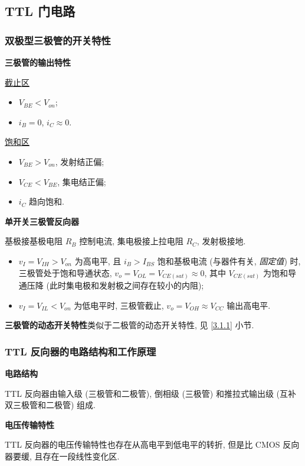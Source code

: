 \subsection{TTL 门电路}
\subsubsection{双极型三极管的开关特性}
\textbf{三极管的输出特性}

\underline{截止区}
\begin{itemize}
    \item $V_{BE}<V_{on}$;
    \item $i_B=0$, $i_C\approx 0$.
\end{itemize}

\underline{饱和区}
\begin{itemize}
    \item $V_{BE}>V_{on}$, 发射结正偏;
    \item $V_{CE}<V_{BE}$, 集电结正偏;
    \item $i_C$ 趋向饱和.
\end{itemize}

\textbf{单开关三极管反向器}

基极接基极电阻 $R_B$ 控制电流, 集电极接上拉电阻 $R_C$, 发射极接地.

\begin{itemize}
    \item $v_I=V_{IH}>V_{on}$ 为高电平, 且 $i_B>I_{BS}$ 饱和基极电流 (与器件有关, \textit{固定值}) 时, 三极管处于饱和导通状态, $v_o=V_{OL}=V_{CE(sat)}\approx 0$, 其中 $V_{CE(sat)}$ 为饱和导通压降 (此时集电极和发射极之间存在较小的内阻);
    \item $v_I=V_{IL}<V_{on}$ 为低电平时, 三极管截止, $v_o=V_{OH}\approx V_{CC}$ 输出高电平.
\end{itemize}

\textbf{三极管的动态开关特性}\quad 类似于二极管的动态开关特性, 见 \ref{3.1.1} 小节.

\subsubsection{TTL 反向器的电路结构和工作原理}
\textbf{电路结构}

TTL 反向器由输入级 (三极管和二极管), 倒相级 (三极管) 和推拉式输出级 (互补双三极管和二极管) 组成.

\textbf{电压传输特性}

TTL 反向器的电压传输特性也存在从高电平到低电平的转折, 但是比 CMOS 反向器要缓, 且存在一段线性变化区.

